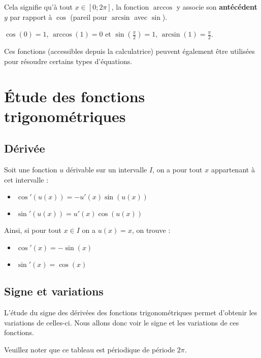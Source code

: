 	Cela signifie qu'à tout $x \in [0; 2\pi]$, la fonction $\arccos$ y associe son \textbf{antécédent} $y$ par rapport à $\cos$ (pareil pour $\arcsin$ avec $\sin$).

	\begin{tip}[Exemple]
		$\cos(0) = 1$, $\arccos(1) = 0$ et $\sin(\frac{\pi}{2}) = 1$, $\arcsin(1) = \frac{\pi}{2}$.
	\end{tip}

	Ces fonctions (accessibles depuis la calculatrice) peuvent également être utilisées pour résoudre certains types d'équations.

	\section{Étude des fonctions trigonométriques}

	\subsection{Dérivée}

	\begin{formula}
		Soit une fonction $u$ dérivable sur un intervalle $I$, on a pour tout $x$ appartenant à cet intervalle :
		\begin{itemize}
			\item $\cos'(u(x)) = -u'(x)\sin(u(x))$
			\item $\sin'(u(x)) = u'(x)\cos(u(x))$
		\end{itemize}
	\end{formula}

	\begin{formula}[Dérivée]
		Ainsi, si pour tout $x \in I$ on a $u(x) = x$, on trouve :
		\begin{itemize}
			\item $\cos'(x) = -\sin(x)$
			\item $\sin'(x) = \cos(x)$
		\end{itemize}
	\end{formula}

	\subsection{Signe et variations}

	L'étude du signe des dérivées des fonctions trigonométriques permet d'obtenir les variations de celles-ci. Nous allons donc voir le signe et les variations de ces fonctions.

	\begin{formula}
		\contentwidth[big]

		Veuillez noter que ce tableau est périodique de période $2\pi$.
	\end{formula}


